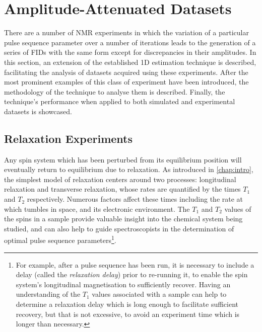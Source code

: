 \section{Amplitude-Attenuated Datasets}
\label{sec:seq}
There are a number of \ac{NMR} experiments in which the
variation of a particular pulse sequence parameter over a number of iterations
leads to the generation of a series of
\acp{FID} with the same form except for discrepancies in their amplitudes.
In this section, an extension of the established \ac{1D} estimation
technique is described, facilitating the analysis of datasets acquired using
these experiments.
After the most prominent examples of this class of experiment have been
introduced, the methodology of the technique to analyse them is described.
Finally, the technique's performance when applied to both simulated and
experimental datasets is showcased.

\subsection{Relaxation Experiments}
\label{subsec:relaxation_experiments}
Any spin system which has been perturbed from its equilibrium position will
eventually return to equilibrium due to relaxation. As introduced in
\cref{chap:intro}, the simplest model of relaxation centers around two
processes: longitudinal relaxation and transverse relaxation, whose rates are
quantified by the times $T_1$ and  $T_2$ respectively.
Numerous factors affect these times including the rate at which
\label{corr:spin-molecule}
tumbles in space, and its electronic environment.
The $T_1$ and $T_2$ values of the spins in a sample provide valuable insight
into the chemical system being studied, and can also help to guide
spectroscopists in the determination of optimal pulse sequence
parameters\footnote{
    For example, after a pulse sequence has been run, it is necessary to include a
    delay (called the \emph{relaxation delay}) prior to
    re-running it, to enable the spin system's longitudinal magnetisation to
    sufficiently recover. Having an understanding of the $T_1$ values
    associated with a sample can help to determine a relaxation delay which is
    long enough to facilitate sufficient recovery, but that is not excessive, to
    avoid an experiment time which is longer than necessary.
}.

